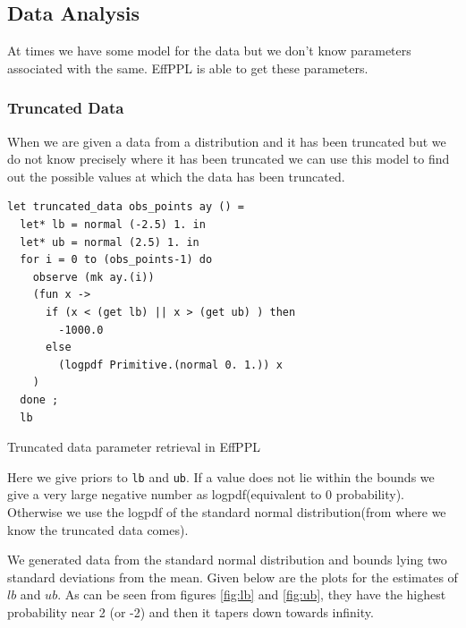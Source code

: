 \documentclass[a4paper,11pt]{article}
\theoremstyle{mytheor}
\begin{document}

    \newpage
    \subsection{Data Analysis}
        At times we have some model for the data but we don't know parameters associated with the same. EffPPL is able to get these parameters. 
        
        \subsubsection{Truncated Data}
        When we are given a data from a distribution and it has been truncated but we do not know precisely where it has been truncated we can use this model to find out the possible values at which the data has been truncated. 
        
\begin{listing}[H]\centering
\begin{verbatim}
let truncated_data obs_points ay () = 
  let* lb = normal (-2.5) 1. in 
  let* ub = normal (2.5) 1. in 
  for i = 0 to (obs_points-1) do 
    observe (mk ay.(i)) 
    (fun x -> 
      if (x < (get lb) || x > (get ub) ) then
        -1000.0
      else 
        (logpdf Primitive.(normal 0. 1.)) x 
    )
  done ;
  lb
\end{verbatim}
\caption{Truncated data parameter retrieval in EffPPL}


\end{listing}
    
    Here we give priors to \lstinline{lb} and \lstinline{ub}. If a value does not lie within the bounds we give a very large negative number as logpdf(equivalent to 0 probability). Otherwise we use the logpdf of the standard normal distribution(from where we know the truncated data comes). 
    
    We generated data from the standard normal distribution and bounds lying two standard deviations from the mean. Given below are the plots for the estimates of $lb$ and $ub$. As can be seen from figures \ref{fig:lb} and \ref{fig:ub}, they have the highest probability near 2 (or -2) and then it tapers down towards infinity.
\end{document}
